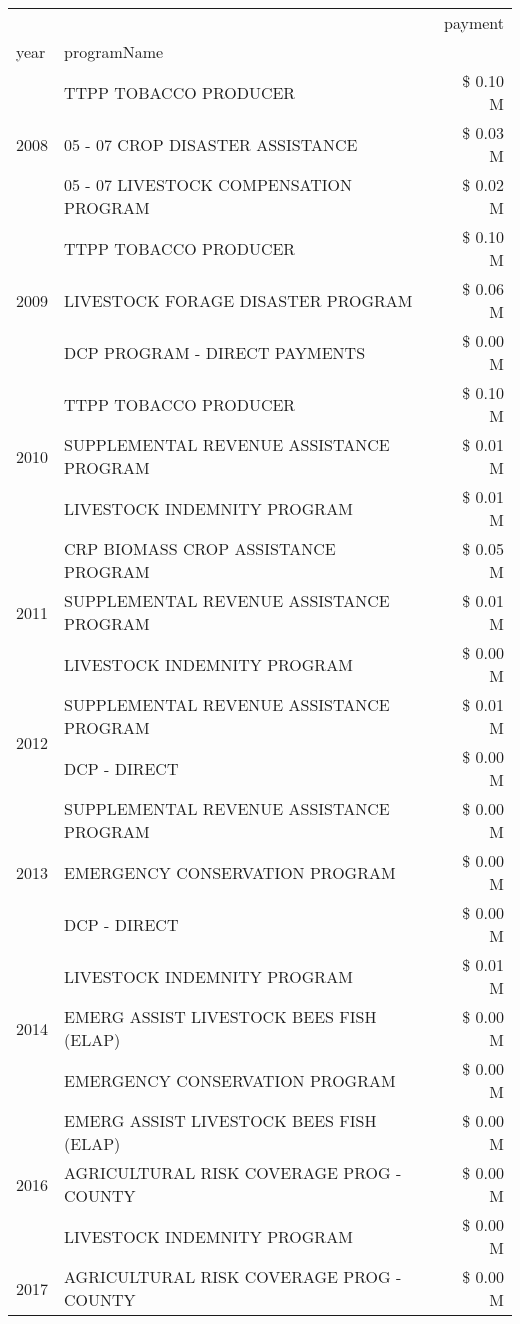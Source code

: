 \begin{tabular}{llr}
\toprule
 &  & payment \\
year & programName &  \\
\midrule
\multirow[t]{3}{*}{2008} & TTPP TOBACCO PRODUCER & \$ 0.10 M \\
 & 05 - 07 CROP DISASTER ASSISTANCE & \$ 0.03 M \\
 & 05 - 07 LIVESTOCK COMPENSATION PROGRAM & \$ 0.02 M \\
\cline{1-3}
\multirow[t]{3}{*}{2009} & TTPP TOBACCO PRODUCER & \$ 0.10 M \\
 & LIVESTOCK FORAGE DISASTER  PROGRAM & \$ 0.06 M \\
 & DCP PROGRAM - DIRECT PAYMENTS & \$ 0.00 M \\
\cline{1-3}
\multirow[t]{3}{*}{2010} & TTPP TOBACCO PRODUCER & \$ 0.10 M \\
 & SUPPLEMENTAL REVENUE ASSISTANCE PROGRAM & \$ 0.01 M \\
 & LIVESTOCK INDEMNITY PROGRAM & \$ 0.01 M \\
\cline{1-3}
\multirow[t]{3}{*}{2011} & CRP BIOMASS CROP ASSISTANCE PROGRAM & \$ 0.05 M \\
 & SUPPLEMENTAL REVENUE ASSISTANCE PROGRAM & \$ 0.01 M \\
 & LIVESTOCK INDEMNITY PROGRAM & \$ 0.00 M \\
\cline{1-3}
\multirow[t]{2}{*}{2012} & SUPPLEMENTAL REVENUE ASSISTANCE PROGRAM & \$ 0.01 M \\
 & DCP - DIRECT & \$ 0.00 M \\
\cline{1-3}
\multirow[t]{3}{*}{2013} & SUPPLEMENTAL REVENUE ASSISTANCE PROGRAM & \$ 0.00 M \\
 & EMERGENCY CONSERVATION PROGRAM & \$ 0.00 M \\
 & DCP - DIRECT & \$ 0.00 M \\
\cline{1-3}
\multirow[t]{3}{*}{2014} & LIVESTOCK INDEMNITY PROGRAM & \$ 0.01 M \\
 & EMERG ASSIST LIVESTOCK BEES FISH (ELAP) & \$ 0.00 M \\
 & EMERGENCY CONSERVATION PROGRAM & \$ 0.00 M \\
\cline{1-3}
\multirow[t]{3}{*}{2016} & EMERG ASSIST LIVESTOCK BEES FISH (ELAP) & \$ 0.00 M \\
 & AGRICULTURAL RISK COVERAGE PROG - COUNTY & \$ 0.00 M \\
 & LIVESTOCK INDEMNITY PROGRAM & \$ 0.00 M \\
\cline{1-3}
\multirow[t]{2}{*}{2017} & AGRICULTURAL RISK COVERAGE PROG - COUNTY & \$ 0.00 M \\

\end{tabular}

